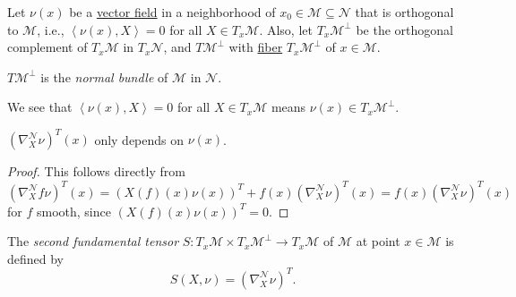 Let \(\nu (x)\) be a \hyperref[def:vector-field]{vector field} in a neighborhood of \(x_0\in \mathcal{M} \subseteq \mathcal{N} \) that is orthogonal to \(\mathcal{M} \), i.e., \(\left\langle \nu (x), X \right\rangle = 0\) for all \(X\in T_x \mathcal{M} \). Also, let \(T_x \mathcal{M} ^{\perp} \) be the orthogonal complement of \(T_x \mathcal{M} \) in \(T_x \mathcal{N} \), and \(T \mathcal{M} ^{\perp} \) with \hyperref[def:fiber]{fiber} \(T_x \mathcal{M} ^{\perp} \) of \(x\in \mathcal{M} \).

\begin{center}
\end{center}

\begin{notation}\label{not:normal-bundle}
	\(T \mathcal{M} ^{\perp} \) is the \emph{normal bundle} of \(\mathcal{M} \) in \(\mathcal{N} \).
\end{notation}

We see that \(\left\langle \nu (x), X \right\rangle = 0\) for all \(X\in T_x \mathcal{M} \) means \(\nu (x)\in T_x \mathcal{M} ^{\perp} \).

\begin{lemma}
	\((\nabla _X ^\mathcal{N} \nu )^T(x)\) only depends on \(\nu (x)\).
\end{lemma}
\begin{proof}
	This follows directly from
	\[
		(\nabla _X ^\mathcal{N} f \nu )^T(x)
		= \left( X(f)(x) \nu (x) \right) ^T + f(x) (\nabla _X ^\mathcal{N} \nu )^T (x)
		= f(x) (\nabla _X ^\mathcal{N} \nu )^T (x)
	\]
	for \(f\) smooth, since \(\left( X(f)(x) \nu (x) \right) ^T = 0\).
\end{proof}

\begin{definition}\label{def:2nd-fundamental-tensor}
	The \emph{second fundamental tensor} \(S\colon T_x \mathcal{M} \times T_x \mathcal{M} ^{\perp} \to T_x \mathcal{M} \) of \(\mathcal{M} \) at point \(x\in \mathcal{M} \) is defined by
	\[
		S(X, \nu ) = (\nabla ^\mathcal{N} _X \nu )^T.
	\]
\end{definition}

